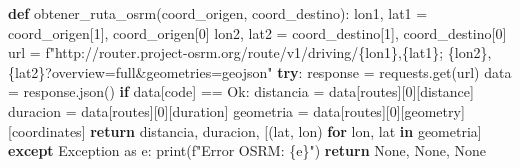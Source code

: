 \documentclass[
  letterpaper,
  DIV=11,
  numbers=noendperiod]{scrreprt}
\newenvironment{Shaded}{\begin{snugshade}}{\end{snugshade}}
\newcommand{\BuiltInTok}[1]{\textcolor[rgb]{0.00,0.23,0.31}{#1}}
\newcommand{\ControlFlowTok}[1]{\textcolor[rgb]{0.00,0.23,0.31}{\textbf{#1}}}
\newcommand{\DecValTok}[1]{\textcolor[rgb]{0.68,0.00,0.00}{#1}}
\newcommand{\ErrorTok}[1]{\textcolor[rgb]{0.68,0.00,0.00}{#1}}
\newcommand{\ImportTok}[1]{\textcolor[rgb]{0.00,0.46,0.62}{#1}}
\newcommand{\KeywordTok}[1]{\textcolor[rgb]{0.00,0.23,0.31}{\textbf{#1}}}
\newcommand{\NormalTok}[1]{\textcolor[rgb]{0.00,0.23,0.31}{#1}}
\newcommand{\OperatorTok}[1]{\textcolor[rgb]{0.37,0.37,0.37}{#1}}
\newcommand{\PreprocessorTok}[1]{\textcolor[rgb]{0.68,0.00,0.00}{#1}}
\newcommand{\SpecialCharTok}[1]{\textcolor[rgb]{0.37,0.37,0.37}{#1}}
\newcommand{\SpecialStringTok}[1]{\textcolor[rgb]{0.13,0.47,0.30}{#1}}
\newcommand{\StringTok}[1]{\textcolor[rgb]{0.13,0.47,0.30}{#1}}
\newcommand{\VariableTok}[1]{\textcolor[rgb]{0.07,0.07,0.07}{#1}}
\begin{document}
\begin{Shaded}
\begin{Highlighting}[]
\KeywordTok{def}\NormalTok{ obtener\_ruta\_osrm(coord\_origen, coord\_destino):}
\NormalTok{    lon1, lat1 }\OperatorTok{=}\NormalTok{ coord\_origen[}\DecValTok{1}\NormalTok{], coord\_origen[}\DecValTok{0}\NormalTok{]}
\NormalTok{    lon2, lat2 }\OperatorTok{=}\NormalTok{ coord\_destino[}\DecValTok{1}\NormalTok{], coord\_destino[}\DecValTok{0}\NormalTok{]}
\NormalTok{    url }\OperatorTok{=} \SpecialStringTok{f"http://router.project{-}osrm.org/route/v1/driving/}\SpecialCharTok{\{}\NormalTok{lon1}\SpecialCharTok{\}}\SpecialStringTok{,}\SpecialCharTok{\{}\NormalTok{lat1}\SpecialCharTok{\}}\SpecialStringTok{;}
\ErrorTok{        \{lon2\},\{lat2\}?overview=full\&geometries=geojson"}
    \ControlFlowTok{try}\NormalTok{:}
\NormalTok{        response }\OperatorTok{=}\NormalTok{ requests.get(url)}
\NormalTok{        data }\OperatorTok{=}\NormalTok{ response.json()}
        \ControlFlowTok{if}\NormalTok{ data[}\StringTok{\textquotesingle{}code\textquotesingle{}}\NormalTok{] }\OperatorTok{==} \StringTok{\textquotesingle{}Ok\textquotesingle{}}\NormalTok{:}
\NormalTok{            distancia }\OperatorTok{=}\NormalTok{ data[}\StringTok{\textquotesingle{}routes\textquotesingle{}}\NormalTok{][}\DecValTok{0}\NormalTok{][}\StringTok{\textquotesingle{}distance\textquotesingle{}}\NormalTok{]}
\NormalTok{            duracion }\OperatorTok{=}\NormalTok{ data[}\StringTok{\textquotesingle{}routes\textquotesingle{}}\NormalTok{][}\DecValTok{0}\NormalTok{][}\StringTok{\textquotesingle{}duration\textquotesingle{}}\NormalTok{]}
\NormalTok{            geometria }\OperatorTok{=}\NormalTok{ data[}\StringTok{\textquotesingle{}routes\textquotesingle{}}\NormalTok{][}\DecValTok{0}\NormalTok{][}\StringTok{\textquotesingle{}geometry\textquotesingle{}}\NormalTok{][}\StringTok{\textquotesingle{}coordinates\textquotesingle{}}\NormalTok{]}
            \ControlFlowTok{return}\NormalTok{ distancia, duracion, [(lat, lon) }\ControlFlowTok{for}\NormalTok{ lon, lat }\KeywordTok{in}\NormalTok{ geometria]}
    \ControlFlowTok{except} \PreprocessorTok{Exception} \ImportTok{as}\NormalTok{ e:}
        \BuiltInTok{print}\NormalTok{(}\SpecialStringTok{f"Error OSRM: }\SpecialCharTok{\{}\NormalTok{e}\SpecialCharTok{\}}\SpecialStringTok{"}\NormalTok{)}
    \ControlFlowTok{return} \VariableTok{None}\NormalTok{, }\VariableTok{None}\NormalTok{, }\VariableTok{None}


\end{Highlighting}
\end{Shaded}
\end{document}
